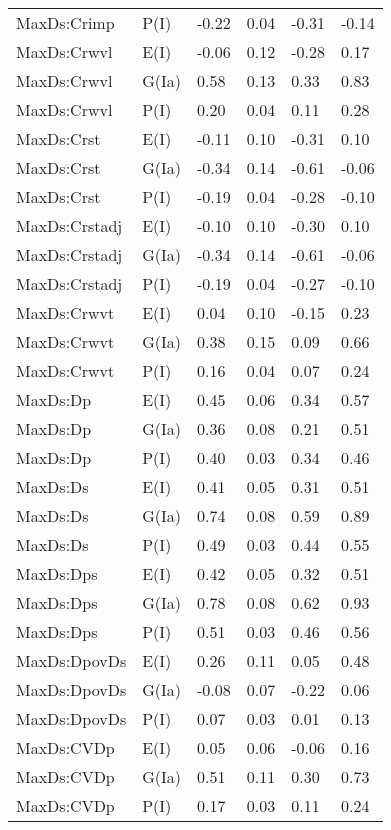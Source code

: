 \begin{center}
\begin{longtable}{|p{1.1in}|p{0.7in}|p{0.7in}|p{0.6in}|p{0.6in}|p{0.6in}|}
  MaxDs:Crimp & P(I) & -0.22 & 0.04 & -0.31 & -0.14 \\ 
  MaxDs:Crwvl & E(I) & -0.06 & 0.12 & -0.28 & 0.17 \\ 
  MaxDs:Crwvl & G(Ia) & 0.58 & 0.13 & 0.33 & 0.83 \\ 
  MaxDs:Crwvl & P(I) & 0.20 & 0.04 & 0.11 & 0.28 \\ 
  MaxDs:Crst & E(I) & -0.11 & 0.10 & -0.31 & 0.10 \\ 
  MaxDs:Crst & G(Ia) & -0.34 & 0.14 & -0.61 & -0.06 \\ 
  MaxDs:Crst & P(I) & -0.19 & 0.04 & -0.28 & -0.10 \\ 
  MaxDs:Crstadj & E(I) & -0.10 & 0.10 & -0.30 & 0.10 \\ 
  MaxDs:Crstadj & G(Ia) & -0.34 & 0.14 & -0.61 & -0.06 \\ 
  MaxDs:Crstadj & P(I) & -0.19 & 0.04 & -0.27 & -0.10 \\ 
  MaxDs:Crwvt & E(I) & 0.04 & 0.10 & -0.15 & 0.23 \\ 
  MaxDs:Crwvt & G(Ia) & 0.38 & 0.15 & 0.09 & 0.66 \\ 
  MaxDs:Crwvt & P(I) & 0.16 & 0.04 & 0.07 & 0.24 \\ 
  MaxDs:Dp & E(I) & 0.45 & 0.06 & 0.34 & 0.57 \\ 
  MaxDs:Dp & G(Ia) & 0.36 & 0.08 & 0.21 & 0.51 \\ 
  MaxDs:Dp & P(I) & 0.40 & 0.03 & 0.34 & 0.46 \\ 
  MaxDs:Ds & E(I) & 0.41 & 0.05 & 0.31 & 0.51 \\ 
  MaxDs:Ds & G(Ia) & 0.74 & 0.08 & 0.59 & 0.89 \\ 
  MaxDs:Ds & P(I) & 0.49 & 0.03 & 0.44 & 0.55 \\ 
  MaxDs:Dps & E(I) & 0.42 & 0.05 & 0.32 & 0.51 \\ 
  MaxDs:Dps & G(Ia) & 0.78 & 0.08 & 0.62 & 0.93 \\ 
  MaxDs:Dps & P(I) & 0.51 & 0.03 & 0.46 & 0.56 \\ 
  MaxDs:DpovDs & E(I) & 0.26 & 0.11 & 0.05 & 0.48 \\ 
  MaxDs:DpovDs & G(Ia) & -0.08 & 0.07 & -0.22 & 0.06 \\ 
  MaxDs:DpovDs & P(I) & 0.07 & 0.03 & 0.01 & 0.13 \\ 
  MaxDs:CVDp & E(I) & 0.05 & 0.06 & -0.06 & 0.16 \\ 
  MaxDs:CVDp & G(Ia) & 0.51 & 0.11 & 0.30 & 0.73 \\ 
  MaxDs:CVDp & P(I) & 0.17 & 0.03 & 0.11 & 0.24 \\ 

\end{longtable}
\end{center}
